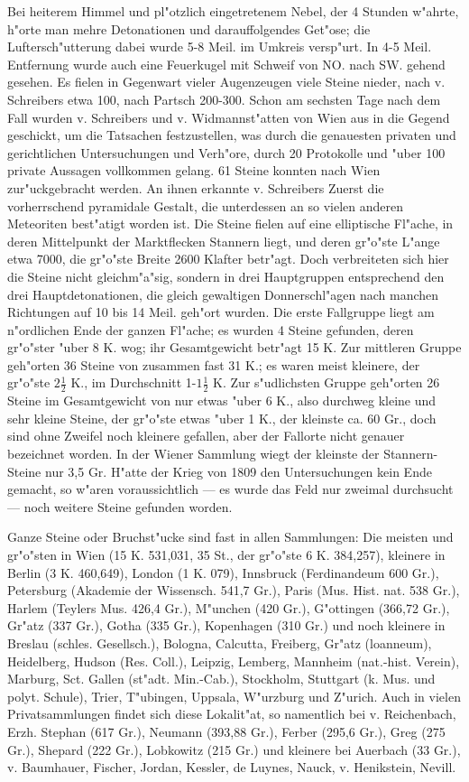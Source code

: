 \documentclass[a4paper, 11pt, oneside]{article}
\begin{document}
Bei heiterem Himmel und pl"otzlich eingetretenem Nebel, der 4 Stunden w"ahrte, h"orte man mehre Detonationen und darauffolgendes Get"ose; die Luftersch"utterung dabei wurde 5-8 Meil. im Umkreis versp"urt. In 4-5 Meil. Entfernung wurde auch eine Feuerkugel mit Schweif von NO. nach SW. gehend gesehen. Es fielen in Gegenwart vieler Augenzeugen viele Steine nieder, nach v. Schreibers etwa 100, nach Partsch 200-300. Schon am sechsten Tage nach dem Fall wurden v. Schreibers und v. Widmannst"atten von Wien aus in die Gegend geschickt, um die Tatsachen festzustellen, was durch die genauesten privaten und gerichtlichen Untersuchungen und Verh"ore, durch 20 Protokolle und "uber 100 private Aussagen vollkommen gelang. 61 Steine konnten nach Wien zur"uckgebracht werden. An ihnen erkannte v. Schreibers Zuerst die vorherrschend pyramidale Gestalt, die unterdessen an so vielen anderen Meteoriten best"atigt worden ist. Die Steine fielen auf eine elliptische Fl"ache, in deren Mittelpunkt der Marktflecken Stannern liegt, und deren gr"o"ste L"ange etwa 7000, die gr"o"ste Breite 2600 Klafter betr"agt. Doch verbreiteten sich hier die Steine nicht gleichm"a"sig, sondern in drei Hauptgruppen entsprechend den drei Hauptdetonationen, die gleich gewaltigen Donnerschl"agen nach manchen Richtungen auf 10 bis 14 Meil. geh"ort wurden. Die erste Fallgruppe liegt am n"ordlichen Ende der ganzen Fl"ache; es wurden 4 Steine gefunden, deren gr"o"ster "uber 8 K. wog; ihr Gesamtgewicht betr"agt 15 K. Zur mittleren Gruppe geh"orten 36 Steine von zusammen fast 31 K.; es waren meist kleinere, der gr"o"ste $2\frac{1}{2}$ K., im Durchschnitt 1-$1\frac{1}{2}$ K. Zur s"udlichsten Gruppe geh"orten 26 Steine im Gesamtgewicht von nur etwas "uber 6 K., also durchweg kleine und sehr kleine Steine, der gr"o"ste etwas "uber 1 K., der kleinste ca. 60 Gr., doch sind ohne Zweifel noch kleinere gefallen, aber der Fallorte nicht genauer bezeichnet worden. In der Wiener Sammlung wiegt der kleinste der Stannern-Steine nur 3,5 Gr. H"atte der Krieg von 1809 den Untersuchungen kein Ende gemacht, so w"aren voraussichtlich --- es wurde das Feld nur zweimal durchsucht --- noch weitere Steine gefunden worden.

Ganze Steine oder Bruchst"ucke sind fast in allen Sammlungen: Die meisten und gr"o"sten in Wien (15 K. 531,031, 35 St., der gr"o"ste 6 K. 384,257), kleinere in Berlin (3 K. 460,649), London (1 K. 079), Innsbruck (Ferdinandeum 600 Gr.), Petersburg (Akademie der Wissensch. 541,7 Gr.), Paris (Mus. Hist. nat. 538 Gr.), Harlem (Teylers Mus. 426,4 Gr.), M"unchen (420 Gr.), G"ottingen (366,72 Gr.), Gr"atz (337 Gr.), Gotha (335 Gr.), Kopenhagen (310 Gr.) und noch kleinere in Breslau (schles. Gesellsch.), Bologna, Calcutta, Freiberg, Gr"atz (loanneum), Heidelberg, Hudson (Res. Coll.), Leipzig, Lemberg, Mannheim (nat.-hist. Verein), Marburg, Sct. Gallen (st"adt. Min.-Cab.), Stockholm, Stuttgart (k. Mus. und polyt. Schule), Trier, T"ubingen, Uppsala, W"urzburg und Z"urich. Auch in vielen Privatsammlungen findet sich diese Lokalit"at, so namentlich bei v. Reichenbach, Erzh. Stephan (617 Gr.), Neumann (393,88 Gr.), Ferber (295,6 Gr.), Greg (275 Gr.), Shepard (222 Gr.), Lobkowitz (215 Gr.) und kleinere bei Auerbach (33 Gr.), v. Baumhauer, Fischer, Jordan, Kessler, de Luynes, Nauck, v. Henikstein, Nevill.
\end{document}
